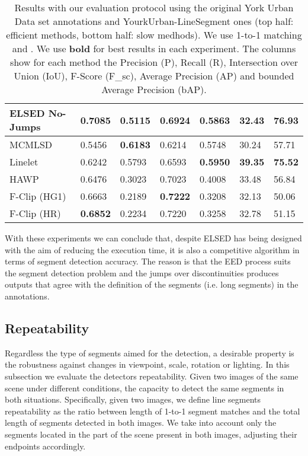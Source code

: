 \documentclass[preprint,12pt]{elsarticle}
\begin{document}
\begin{table}
\begin{tabular}{|l||l|l|l|l||l|l|}
ELSED No-Jumps & \textbf{0.7085} & 0.5115 & \textbf{0.6924} & 0.5863 & 32.43 & \textbf{76.93} \\ \hline
MCMLSD  & 0.5456 & \textbf{0.6183} & 0.6214 & 0.5748 & 30.24 & 57.71 \\
Linelet & 0.6242 & 0.5793 & 0.6593 & \textbf{0.5950} & \textbf{39.35} & \textbf{75.52} \\
HAWP & 0.6476 & 0.3023 & 0.7023 & 0.4008 & 33.48 & 56.84 \\ 
F-Clip (HG1) & 0.6663 & 0.2189 & \textbf{0.7222} & 0.3208 & 32.13 & 50.06\\ 
F-Clip (HR) & \textbf{0.6852} & 0.2234 & 0.7220 & 0.3258 & 32.78 & 51.15 \\ \hline
\end{tabular}


\caption{Results with our evaluation protocol using the original York Urban Data set annotations and YourkUrban-LineSegment ones (top half: efficient methods, bottom half: slow medhods). We use 1-to-1 matching and . We use \textbf{bold} for best results in each experiment. The columns show for each method the Precision (P), Recall (R), Intersection over Union (IoU), F-Score (F\_sc), Average Precision (AP) and bounded Average Precision (bAP).}
\label{table:ours_segment_detection_yud}
\end{table}

With these experiments we can conclude that, despite ELSED has being designed with the aim of reducing the execution time, it is also a competitive algorithm in terms of segment detection accuracy. The reason is that the EED process suits the segment detection problem and the jumps over discontinuities produces outputs that agree with the definition of the segments (i.e. long segments) in the annotations.



\subsection{Repeatability}
\label{sec:repeatability}

Regardless the type of segments aimed for the detection, a desirable property is the robustness against changes in viewpoint, scale, rotation or lighting. In this subsection we evaluate the detectors repeatability. Given two images of the same scene under different conditions, the capacity to detect the same segments in both situations. Specifically, given two images, we define line segments repeatability as the ratio between length of 1-to-1 segment matches and the total length of segments detected in both images. We take into account only the segments located in the part of the scene present in both images, adjusting their endpoints accordingly. 
\end{document}
